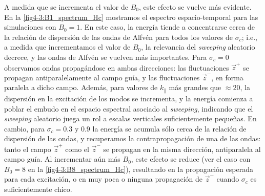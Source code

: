A medida que se incrementa el valor de $B_0$, este efecto se vuelve
más evidente. En la \cref{fig4-3:B1_spectrum_Hc} mostramos el espectro
espacio-temporal para las simulaciones con $B_0=1$. En este caso, la
energía tiende a concentrarse cerca de la relación de dispersión de
las ondas de Alfvén para todos los valores de $\sigma_c$; i.e., a
medida que incrementamos el valor de $B_0$, la relevancia del
\textit{sweeping} aleatorio decrece, y las ondas de Alfvén se vuelven más
importantes. Para $\sigma_c=0$ observamos ondas propagándose en ambas
direcciones: las fluctuaciones $\vec{z}^+$ se propagan
antiparalelamente al campo guía, y las fluctuaciones $\vec{z}^-$, en
forma paralela a dicho campo. Además, para valores de $k_\parallel$
más grandes que $\approx 20$, la dispersión en la excitación de los
modos se incrementa, y la energía comienza a poblar el embudo en el
espacio espectral asociado al \textit{sweeping}, indicando que el \textit{sweeping}
aleatorio juega un rol a escalas verticales suficientemente
pequeñas. En cambio, para $\sigma_c =0.3$ y $0.9$ la energía se
acumula sólo cerca de la relación de dispersión de las ondas, y
recuperamos la contrapropagación de una de las ondas: tanto el campo
$\vec{z}^+$ como el $\vec{z}^-$ se propagan en la misma dirección,
antiparalela al campo guía. Al incrementar aún más $B_0$, este efecto
se reduce (ver el caso con $B_0=8$ en la \cref{fig4-3:B8_spectrum_Hc}),
resultando en la propagación esperada para cada excitación, o en muy
poca o ninguna propagación de $\vec{z}^-$ cuando $\sigma_c$ es
suficientemente chico.

